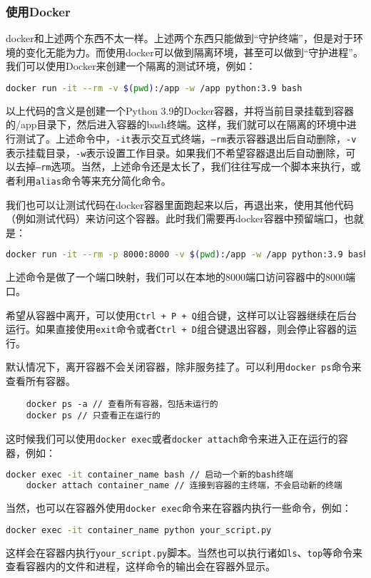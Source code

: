 \subsubsection{使用Docker}

docker和上述两个东西不太一样。上述两个东西只能做到“守护终端”，但是对于环境的变化无能为力。而使用docker可以做到隔离环境，甚至可以做到“守护进程”。我们可以使用Docker来创建一个隔离的测试环境，例如：
\begin{lstlisting}[language=bash]
    docker run -it --rm -v $(pwd):/app -w /app python:3.9 bash
\end{lstlisting}
以上代码的含义是创建一个Python 3.9的Docker容器，并将当前目录挂载到容器的/app目录下，然后进入容器的bash终端。这样，我们就可以在隔离的环境中进行测试了。上述命令中，\texttt{-it}表示交互式终端，\texttt{--rm}表示容器退出后自动删除，\texttt{-v}表示挂载目录，\texttt{-w}表示设置工作目录。如果我们不希望容器退出后自动删除，可以去掉\texttt{--rm}选项。当然，上述命令还是太长了，我们往往写成一个脚本来执行，或者利用\texttt{alias}命令等来充分简化命令。

我们也可以让测试代码在docker容器里面跑起来以后，再退出来，使用其他代码（例如测试代码）来访问这个容器。此时我们需要再docker容器中预留端口，也就是：
\begin{lstlisting}[language=bash]
    docker run -it --rm -p 8000:8000 -v $(pwd):/app -w /app python:3.9 bash
\end{lstlisting}
上述命令是做了一个端口映射，我们可以在本地的8000端口访问容器中的8000端口。

希望从容器中离开，可以使用\texttt{Ctrl + P + Q}组合键，这样可以让容器继续在后台运行。如果直接使用\texttt{exit}命令或者\texttt{Ctrl + D}组合键退出容器，则会停止容器的运行。

默认情况下，离开容器不会关闭容器，除非服务挂了。可以利用\texttt{docker ps}命令来查看所有容器。
\begin{lstlisting}
    docker ps -a // 查看所有容器，包括未运行的
    docker ps // 只查看正在运行的
\end{lstlisting}

这时候我们可以使用\texttt{docker exec}或者\texttt{docker attach}命令来进入正在运行的容器，例如：
\begin{lstlisting}[language=bash]
    docker exec -it container_name bash // 启动一个新的bash终端
    docker attach container_name // 连接到容器的主终端，不会启动新的终端
\end{lstlisting}

当然，也可以在容器外使用\texttt{docker exec}命令来在容器内执行一些命令，例如：
\begin{lstlisting}[language=bash]
    docker exec -it container_name python your_script.py
\end{lstlisting}
这样会在容器内执行\texttt{your\_script.py}脚本。当然也可以执行诸如\texttt{ls}、\texttt{top}等命令来查看容器内的文件和进程，这样命令的输出会在容器外显示。

